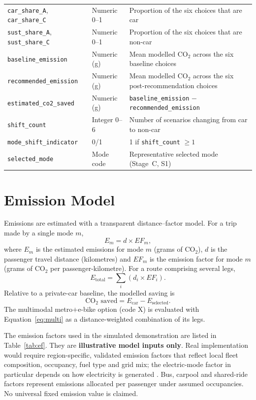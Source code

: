 \documentclass[11pt,a4paper]{article}
\newcommand{\code}[1]{\texttt{#1}}
\begin{document}
\begin{longtable}{@{}p{3.5cm}p{1.9cm}p{8.2cm}@{}}
\code{car\_share\_A}, \code{car\_share\_C} & Numeric 0--1 & Proportion of the six choices that are car\\
\code{sust\_share\_A}, \code{sust\_share\_C} & Numeric 0--1 & Proportion of the six choices that are non-car\\
\code{baseline\_emission} & Numeric (g) & Mean modelled CO$_2$ across the six baseline choices\\
\code{recommended\_emission} & Numeric (g) & Mean modelled CO$_2$ across the six post-recommendation choices\\
\code{estimated\_co2\_saved} & Numeric (g) & \code{baseline\_emission} $-$ \code{recommended\_emission}\\
\code{shift\_count} & Integer 0--6 & Number of scenarios changing from car to non-car\\
\code{mode\_shift\_indicator} & 0/1 & 1 if \code{shift\_count} $\geq 1$\\
\code{selected\_mode} & Mode code & Representative selected mode (Stage~C, S1)\\
\end{longtable}

\section{Emission Model}
\label{sec:emission}

Emissions are estimated with a transparent distance--factor model. For a trip made by a single mode
$m$,
\begin{equation}
E_m = d \times EF_m,
\label{eq:single}
\end{equation}
where $E_m$ is the estimated emissions for mode $m$ (grams of CO$_2$), $d$ is the passenger travel
distance (kilometres) and $EF_m$ is the emission factor for mode $m$ (grams of CO$_2$ per
passenger-kilometre). For a route comprising several legs,
\begin{equation}
E_{\text{total}} = \sum_{i} \left( d_i \times EF_i \right).
\label{eq:multi}
\end{equation}
Relative to a private-car baseline, the modelled saving is
\begin{equation}
\text{CO}_2\text{ saved} = E_{\text{car}} - E_{\text{selected}}.
\label{eq:saved}
\end{equation}
The multimodal metro$+$e-bike option (code X) is evaluated with Equation~\ref{eq:multi} as a
distance-weighted combination of its legs.

The emission factors used in the simulated demonstration are listed in Table~\ref{tab:ef}. They are
\textbf{illustrative model inputs only}. Real implementation would require region-specific, validated
emission factors that reflect local fleet composition, occupancy, fuel type and grid mix; the
electric-mode factor in particular depends on how electricity is generated \citep{ndhlovu2025}.
Bus, carpool and shared-ride factors represent emissions allocated per passenger under assumed
occupancies. No universal fixed emission value is claimed.
\end{document}
